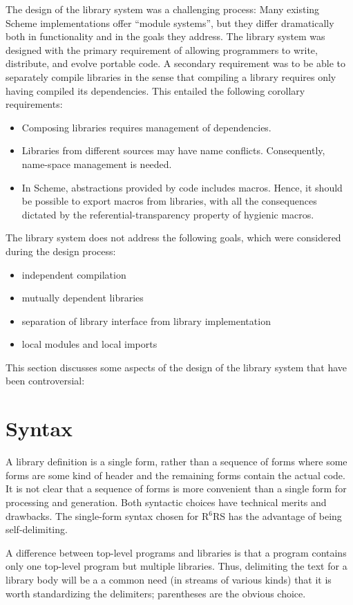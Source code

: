 \documentclass[twoside,twocolumn]{algol60}
\newcommand{\rn}[1]{R$^{#1}$RS}
\begin{document}
The design of the library system was a challenging process: Many
existing Scheme implementations offer ``module systems'', but they
differ dramatically both in functionality and in the goals they
address.  The library system was designed with the primary
requirement of allowing programmers to write, distribute, and evolve
portable code.  A secondary requirement was to be able to separately
compile libraries in the sense that compiling a library requires only
having compiled its dependencies.  This entailed the following
corollary requirements:
%
\begin{itemize}
\item Composing libraries requires management of dependencies.
\item Libraries from different sources may have name conflicts.
  Consequently, name-space management is needed.
\item In Scheme, abstractions provided by code includes macros.
  Hence, it should be possible to export macros from libraries, with all
  the consequences dictated by the referential-transparency property
  of hygienic macros.
\end{itemize}
%
The library system does not address the following goals, which were
considered during the design process:
%
\begin{itemize}
\item independent compilation
\item mutually dependent libraries
\item separation of library interface from library implementation
\item local modules and local imports
\end{itemize}
%
This section discusses some aspects of the design of the library
system that have been controversial:

\section{Syntax}

A library definition is a single form, rather than a sequence of forms
where some forms are some kind of header and the remaining forms
contain the actual code.
It is not clear that a sequence of forms is more convenient than a
single form for processing and generation. Both syntactic choices have
technical merits and drawbacks. The single-form syntax chosen for
\rn{6} has the advantage of being self-delimiting.

A difference between top-level programs and libraries is that a
program contains only one top-level program but multiple libraries.
Thus, delimiting the text for a library body will be a
a common need (in streams of various kinds) that it is worth
standardizing the delimiters; parentheses are the obvious choice.
\end{document}
